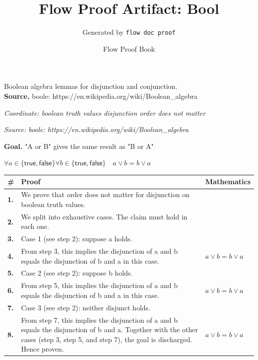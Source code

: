 \documentclass[11pt]{article}
\title{Flow Proof Artifact: Bool}
\author{Generated by \texttt{flow doc proof}}
\date{Flow Proof Book}
\theoremstyle{definition}
\begin{document}
\maketitle
Boolean algebra lemmas for disjunction and conjunction.\\[0.5em]
\textbf{Source.} boole: https://en.wikipedia.org/wiki/Boolean\_algebra\\[0.5em]
\bigskip
{}\par
\smallskip\noindent\textit{Coordinate: boolean truth values \cdot disjunction \cdot order does not matter}\par
\smallskip\noindent\textit{Source: boole: https://en.wikipedia.org/wiki/Boolean\_algebra}\par
\medskip
\noindent\textbf{Goal.} "A or B" gives the same result as "B or A"\par
\noindent$\displaystyle \forall a \in \{\mathsf{true}, \mathsf{false}\} \forall b \in \{\mathsf{true}, \mathsf{false}\}\quad a \lor b = b \lor a$\par
\medskip
\noindent
\begin{tabular}{@{} >{\raggedright\arraybackslash}p{} >{\raggedright\arraybackslash}p{} >{\raggedleft\arraybackslash}p{} @{}}
\textbf{\#} & \textbf{Proof} & \textbf{Mathematics} \\
\midrule
\textbf{1.} & We prove that order does not matter for disjunction on boolean truth values. & \\[0.45em]
\textbf{2.} & We split into exhaustive cases. The claim must hold in each one. & \\[0.45em]
\textbf{3.} & Case 1 (see step 2): suppose a holds. & \\[0.45em]
\textbf{4.} & From step 3, this implies the disjunction of a and b equals the disjunction of b and a in this case. & $\displaystyle a \lor b = b \lor a$ \\[0.45em]
\textbf{5.} & Case 2 (see step 2): suppose b holds. & \\[0.45em]
\textbf{6.} & From step 5, this implies the disjunction of a and b equals the disjunction of b and a in this case. & $\displaystyle a \lor b = b \lor a$ \\[0.45em]
\textbf{7.} & Case 3 (see step 2): neither disjunct holds. & \\[0.45em]
\textbf{8.} & From step 7, this implies the disjunction of a and b equals the disjunction of b and a. Together with the other cases (step 3, step 5, and step 7), the goal is discharged. Hence proven. & $\displaystyle a \lor b = b \lor a$ \\[0.45em]
\bottomrule
\end{tabular}
\end{document}
